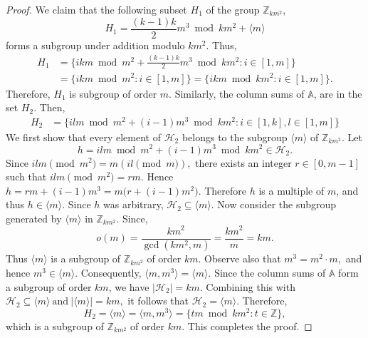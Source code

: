 \documentclass[10pt,a4paper]{amsart}
\begin{document}
\begin{proof}
\noindent We claim that the following subset $H_1$ of the group $\mathbb{Z}_{k m^2}$,
\[
H_1 = \frac{(k-1
)k}{2}m^3 \bmod{km^2}+  \langle m \rangle   
\]
forms a subgroup under addition modulo $k m^2$.
Thus, \begin{align*}
    H_1 & = \{ikm\bmod{m^2}+ \frac{(k-1)k}{2}m^3\bmod{km^2}: i \in [1, m]\}\\
    & = \{ikm\bmod{m^2}:  i \in [1, m]\} = \{ikm\bmod{km^2}:  i \in [1, m]\}.
\end{align*}
\noindent Therefore, $H_1$ is  subgroup of order $m$. Similarly, the column sums of $\mathbb{A}$, are in the set $H_2$. Then, \begin{align*}
    H_2&= \{ilm\bmod{m^2}+(i-1)m^3\bmod{km^2} : i \in[1,k], l \in[1,m]\}
\end{align*} 
We first show that every element of \(\mathcal H_2\) belongs to the subgroup
\(\langle m\rangle\) of \(\mathbb Z_{km^2}\). Let
\[
h=ilm \bmod{m^2}+(i-1)m^3 \bmod{km^2}
\in \mathcal H_2.
\]
Since
\(
ilm \pmod{m^2}=m(il \pmod m),
\)
there exists an integer \(r\in[0,m-1]\) such that
\(
ilm \pmod{m^2}=rm.
\)
Hence
\(
h=rm+(i-1)m^3=m\bigl(r+(i-1)m^2\bigr).
\)
Therefore \(h\) is a multiple of \(m\), and thus
\(
h\in \langle m\rangle.
\)
Since \(h\) was arbitrary,
\(
\mathcal H_2\subseteq \langle m\rangle\). Now consider the subgroup generated by $\langle m\rangle$ in $\mathbb{Z}_{km^2}$. Since,
\[ o(m)=\frac{km^2}{\gcd(km^2,m)}=
\frac{km^2}{m}=
km.
\]
Thus \(\langle m\rangle\) is a subgroup of \(\mathbb Z_{km^2}\) of order \(km\). Observe also that
\(
m^3=m^2\cdot m,
\)
and hence
\(
m^3\in\langle m\rangle.
\)
Consequently,
\(
\langle m,m^3\rangle=\langle m\rangle.
\) Since the column sums of \(\mathbb A\) form a subgroup of order \(km\), we have
\(
|\mathcal H_2|=km.
\)
Combining this with
\(
\mathcal H_2\subseteq \langle m\rangle
~\text{and}~
|\langle m\rangle|=km,
\)
it follows that
\(
\mathcal H_2=\langle m\rangle.
\)
Therefore, 
\[H_2=\langle m\rangle=
\langle m,m^3\rangle=
\{tm \bmod{km^2}: t\in\mathbb Z\},
\]
\noindent which is a subgroup of \(\mathbb Z_{km^2}\) of order \(km\). This completes the proof.\end{proof}
\end{document}
